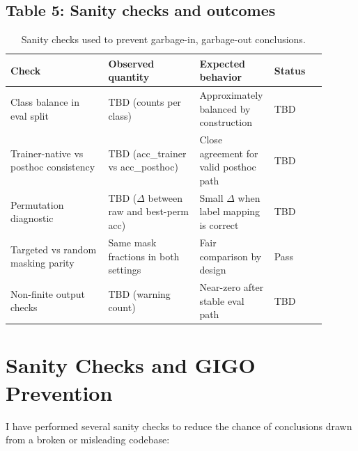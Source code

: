 \documentclass[10pt]{article}
\begin{document}
\subsection*{Table 5: Sanity checks and outcomes}
\begin{table}[h]
\centering
\small
\begin{tabular}{|p{0.30\linewidth}|p{0.28\linewidth}|p{0.16\linewidth}|p{0.16\linewidth}|}
\hline
Check & Observed quantity & Expected behavior & Status \\
\hline
Class balance in eval split & TBD (counts per class) & Approximately balanced by construction & TBD \\
\hline
Trainer-native vs posthoc consistency & TBD (acc\_trainer vs acc\_posthoc) & Close agreement for valid posthoc path & TBD \\
\hline
Permutation diagnostic & TBD ($\Delta$ between raw and best-perm acc) & Small $\Delta$ when label mapping is correct & TBD \\
\hline
Targeted vs random masking parity & Same mask fractions in both settings & Fair comparison by design & Pass \\
\hline
Non-finite output checks & TBD (warning count) & Near-zero after stable eval path & TBD \\
\hline
\end{tabular}
\caption{Sanity checks used to prevent garbage-in, garbage-out conclusions.}
\end{table}


\section{Sanity Checks and GIGO Prevention}

I have performed several sanity checks to reduce the chance of conclusions drawn from a broken or misleading codebase:
\end{document}
